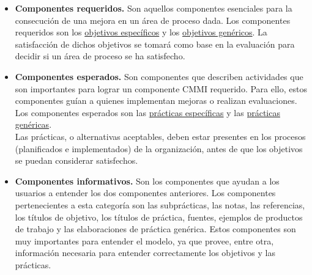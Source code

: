 \begin{itemize}
	\item \textbf{Componentes requeridos.} Son aquellos componentes esenciales para la consecución de una mejora en un área de proceso dada. Los componentes requeridos son los \hyperlink{sgoal}{objetivos específicos} y los \hyperlink{ggoal}{objetivos genéricos}. La satisfacción de dichos objetivos se tomará como base en la evaluación para decidir si un área de proceso se ha satisfecho.
	
	\item \textbf{Componentes esperados.} Son componentes que describen actividades que son importantes para lograr un componente CMMI requerido. Para ello, estos componentes guían a quienes implementan mejoras o realizan evaluaciones. Los componentes esperados son las \hyperlink{spractice}{prácticas específicas} y las \hyperlink{gpractice}{prácticas genéricas}.\\
	Las prácticas, o alternativas aceptables, deben estar presentes en los procesos (planificados e implementados) de la organización, antes de que los objetivos se puedan considerar satisfechos.
	
	\item \textbf{Componentes informativos.} Son los componentes que ayudan a los usuarios a entender los dos componentes anteriores. Los componentes pertenecientes a esta categoría son las subprácticas, las notas, las referencias, los títulos de objetivo, los títulos de práctica, fuentes, ejemplos de productos de trabajo y las elaboraciones de práctica genérica. Estos componentes son muy importantes para entender el modelo, ya que provee, entre otra, información necesaria para entender correctamente los objetivos y las prácticas. 	
	
		 
\end{itemize}